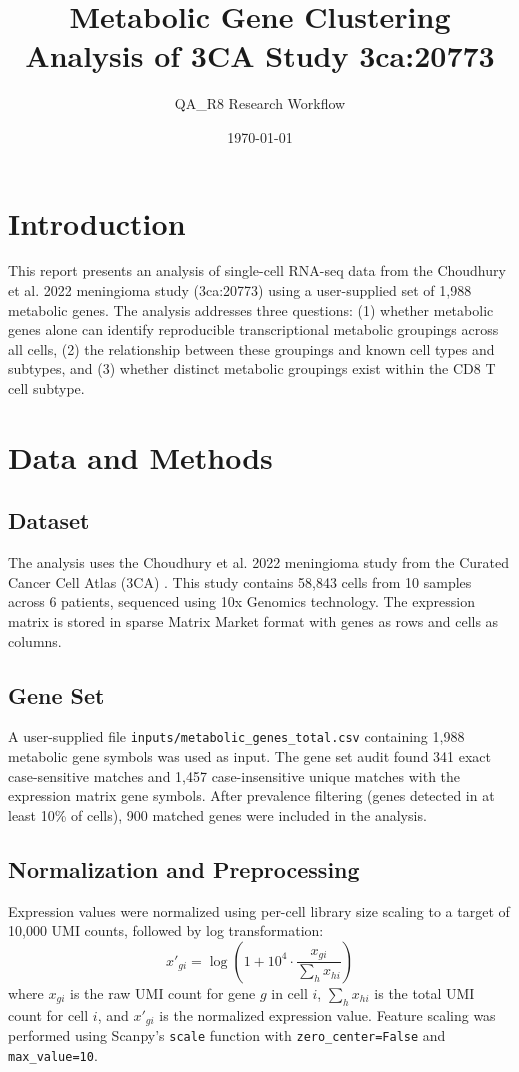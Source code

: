 \documentclass[11pt, a4paper]{article}
\title{Metabolic Gene Clustering Analysis of 3CA Study 3ca:20773}
\author{QA\_R8 Research Workflow}
\date{\today}
\begin{document}
\maketitle

\section{Introduction}
This report presents an analysis of single-cell RNA-seq data from the Choudhury et al. 2022 meningioma study (3ca:20773) using a user-supplied set of 1,988 metabolic genes. The analysis addresses three questions: (1) whether metabolic genes alone can identify reproducible transcriptional metabolic groupings across all cells, (2) the relationship between these groupings and known cell types and subtypes, and (3) whether distinct metabolic groupings exist within the CD8 T cell subtype.

\section{Data and Methods}
\subsection{Dataset}
The analysis uses the Choudhury et al. 2022 meningioma study from the Curated Cancer Cell Atlas (3CA) \cite{choudhury_2022}. This study contains 58,843 cells from 10 samples across 6 patients, sequenced using 10x Genomics technology. The expression matrix is stored in sparse Matrix Market format with genes as rows and cells as columns.

\subsection{Gene Set}
A user-supplied file \texttt{inputs/metabolic\_genes\_total.csv} containing 1,988 metabolic gene symbols was used as input. The gene set audit found 341 exact case-sensitive matches and 1,457 case-insensitive unique matches with the expression matrix gene symbols. After prevalence filtering (genes detected in at least 10\% of cells), 900 matched genes were included in the analysis.

\subsection{Normalization and Preprocessing}
Expression values were normalized using per-cell library size scaling to a target of 10,000 UMI counts, followed by log transformation:
\begin{equation}
x'_{gi} = \log\left(1 + 10^4 \cdot \frac{x_{gi}}{\sum_h x_{hi}}\right)
\end{equation}
where $x_{gi}$ is the raw UMI count for gene $g$ in cell $i$, $\sum_h x_{hi}$ is the total UMI count for cell $i$, and $x'_{gi}$ is the normalized expression value. Feature scaling was performed using Scanpy's \texttt{scale} function with \texttt{zero\_center=False} and \texttt{max\_value=10}.
\end{document}
